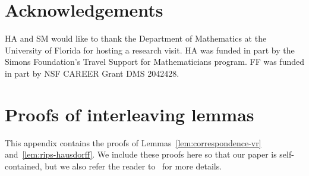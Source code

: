 \documentclass[11pt, reqno, english]{amsart}
\begin{document}
\section*{Acknowledgements}

HA and SM would like to thank the Department of Mathematics at the University of Florida for hosting a research visit.
HA was funded in part by the Simons Foundation's Travel Support for Mathematicians program.
FF was funded in part by NSF CAREER Grant DMS 2042428.
 







\appendix



\section{Proofs of interleaving lemmas}
\label{app:proofs-interleavings}

This appendix contains the proofs of Lemmas~\ref{lem:correspondence-vr} and~\ref{lem:rips-hausdorff}.
We include these proofs here so that our paper is self-contained, but we also refer the reader to~\cite{ChazalDeSilvaOudot2014} for more details.
\end{document}
